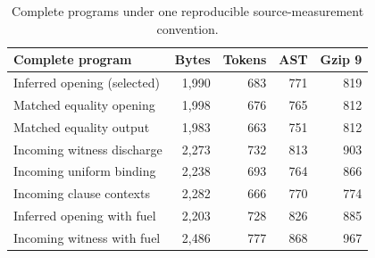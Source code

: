 \begin{table}[htbp]
\centering\small
\begin{tabular}{@{}lrrrr@{}}
\toprule
Complete program & Bytes & Tokens & AST & Gzip 9\\
\midrule
Inferred opening (selected) & 1,990 & 683 & 771 & 819\\
Matched equality opening & 1,998 & 676 & 765 & 812\\
Matched equality output & 1,983 & 663 & 751 & 812\\
Incoming witness discharge & 2,273 & 732 & 813 & 903\\
Incoming uniform binding & 2,238 & 693 & 764 & 866\\
Incoming clause contexts & 2,282 & 666 & 770 & 774\\
Inferred opening with fuel & 2,203 & 728 & 826 & 885\\
Incoming witness with fuel & 2,486 & 777 & 868 & 967\\
\bottomrule
\end{tabular}
\caption{Complete programs under one reproducible source-measurement convention.}
\label{tab:metrics}
\end{table}

